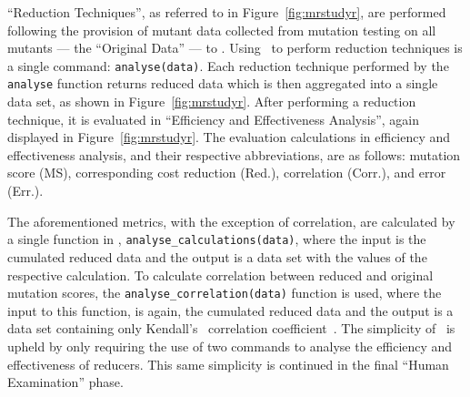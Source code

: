 ``Reduction Techniques'', as referred to in Figure~\ref{fig:mrstudyr}, are performed following the provision
of mutant data collected from mutation testing on all mutants --- the ``Original Data'' --- to \mr. Using
\mr~to perform reduction techniques is a single command: \texttt{analyse(data)}. Each reduction technique performed by
the \texttt{analyse} function returns reduced data which is then aggregated into a single data set, as shown in
Figure~\ref{fig:mrstudyr}. After performing a reduction technique, it is evaluated in ``Efficiency and Effectiveness
Analysis'', again displayed in Figure~\ref{fig:mrstudyr}.
The evaluation calculations in efficiency and effectiveness analysis, and their respective abbreviations, are as
follows: mutation score
(MS), corresponding cost reduction (Red.), correlation (Corr.), and error (Err.).


The aforementioned metrics, with the exception of correlation, are calculated by a single function in \mr,
\texttt{analyse\_calculations(data)}, where the input is the cumulated reduced data and the output is a data set with
the values of the respective calculation. To calculate correlation between reduced and original mutation scores, the
\texttt{analyse\_correlation(data)} function is used, where the input to this function, is again, the cumulated reduced
data and the output is a data set containing only Kendall's \taub~correlation coefficient~\cite{mcminn2016virtual}. The
simplicity of \mr~is upheld by only requiring the use of two commands to analyse the efficiency and effectiveness of
reducers. This same simplicity is continued in the final ``Human Examination'' phase.


